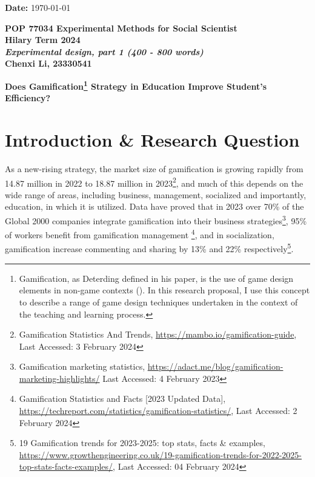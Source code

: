 \documentclass[12pt]{article} %
\begin{document}
\vspace{.3cm}

\noindent \textbf{Date: } \today

\newpage
\begin{center}
	\textbf{POP 77034 Experimental Methods for Social Scientist}\\
	\textbf{Hilary Term 2024}\\
	\textbf{\textit{Experimental design, part 1 (400 - 800 words)}} \\
	\vspace{.3cm}
	\textbf{Chenxi Li, 23330541}
\end{center}

\vspace{.3cm}

\noindent \textbf{Does Gamification\footnote{Gamification, as Deterding defined in his paper, is the use of game design elements in non-game contexts (\cite{deterding2011game}). In this research proposal, I use this concept to describe a range of game design techniques undertaken in the context of the teaching and learning process.} Strategy in Education Improve Student's Efficiency?}\\

\section*{Introduction \& Research Question}
\noindent As a new-rising strategy, the market size of gamification is growing rapidly from 14.87 million in 2022 to 18.87 million in 2023\footnote{Gamification Statistics And Trends, \url{https://mambo.io/gamification-guide}, Last Accessed: 3 February 2024}, and much of this depends on the wide range of areas, including business, management, socialized and importantly, education, in which it is utilized. Data have proved that in 2023 over 70\% of the Global 2000 companies integrate gamification into their business strategies\footnote{Gamification marketing statistics, \url{https://adact.me/blog/gamification-marketing-highlights/} Last Accessed: 4 February 2023}, 95\% of workers benefit from gamification management \footnote{Gamification Statistics and Facts [2023 Updated Data], \url{https://techreport.com/statistics/gamification-statistics/}, Last Accessed: 2 February 2024}, and in socialization, gamification increase commenting and sharing by 13\% and 22\% respectively\footnote{19 Gamification trends for 2023-2025: top stats, facts \& examples,\url{ https://www.growthengineering.co.uk/19-gamification-trends-for-2022-2025-top-stats-facts-examples/}, Last Accessed: 04 February 2024}.\\
\end{document}
